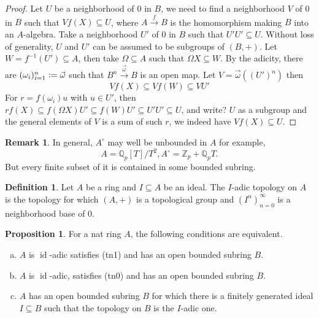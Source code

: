 \documentclass[10pt]{article}
\numberwithin{equation}{section}
\theoremstyle{definition}
\newtheorem{proposition}{Proposition}[subsection]
\newtheorem{definition}{Definition}[subsection]
\newtheorem{remark}{Remark}[subsection]
\DeclareMathOperator{\id}{id}
\newcommand{\defeq}{\vcentcolon=}
\newcommand{\Z}[0]{\mathbb{Z}}
\newcommand{\Q}[0]{\mathbb{Q}}
\begin{document}
\begin{proof}
    Let $U$ be a neighborhood of $0$ in $B$, we need to find a neighborhood $V$ of $0$ in $B$ such that $Vf(X)\subseteq U$, where $A\stackrel{f}{\to}B$ is the homomorphism making $B$ into an $A$-algebra. Take a neighborhood $U'$ of $0$ in $B$ such that $U'U'\subseteq U$. Without loss of generality, $U$ and $U'$ can be assumed to be subgroups of $(B,+)$.
    Let $W=f^{-1}(U')\subseteq A$, then take $\Omega\subseteq A$ such that $\Omega X\subseteq W$. By the adicity, there are $(\omega_i)_{i=1}^n\defeq\vec{\omega}$ such that $B^n\stackrel{\vec{\omega}}{\to}B$ is an open map.
    Let $V = \vec{\omega}((U')^n)$ then
    \begin{equation*}
        Vf(X)\subseteq Vf(W)\subseteq V U'
    \end{equation*} For $r = f(\omega_i)u$ with $u\in U'$, then
    $rf(X) \subseteq f(\Omega X)U'\subseteq f(W)U'\subseteq U'U'\subseteq U$, and write? $U$ as a subgroup and the general elements of $V$ is a sum of such $r$, we indeed have $Vf(X)\subseteq U$.
\end{proof}

\begin{remark}
    \label{remark_17_2}
    In general, $A^\circ$ may well be unbounded in $A$ for example,
    \begin{equation*}
        A=\Q_p[T]/T^2,A^\circ = \Z_p+\Q_pT.
    \end{equation*}
    But every finite subset of it is contained in some bounded subring.
\end{remark}

\begin{definition}
    \label{definition_17_2}
    Let $A$ be a ring and $I\subseteq A$ be an ideal. The $I$-adic topology on $A$ is the topology for which $(A,+)$ is a topological group and $(I^n)_{n=0}^\infty$ is a neighborhood base of $0$.
\end{definition}

\begin{proposition}
    \label{proposition_17_2}
    For a nat ring $A$, the following conditions are equivalent.
    \begin{enumerate}[a.]
        \item $A$ is $\id$-adic satisfies (tn1) and has an open bounded subring $B$.
        \item $A$ is $\id$-adic, satisfies (tn0) and has an open bounded subring $B$.
        \item $A$ has an open bounded subring $B$ for which there is a finitely generated ideal $I\subseteq B$ such that the topology on $B$ is the $I$-adic one.
    \end{enumerate}
\end{proposition}
\end{document}
